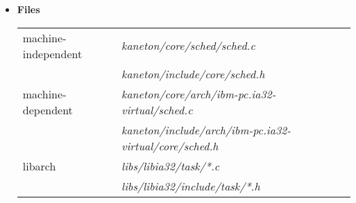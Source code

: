 \begin{itemize}
	 {
	   This function permits the current thread to relinquish
	   the processor voluntarily.

	   Do not care about the argument .
	 }

	 {
	   This function adds a runnable thread to the scheduler. Even
	   if the added thread has the highest priority, do not yield
	   the current thread.
	 }

	 {
	   This function removes a thread from the
	   scheduler. \textbf{Be careful:} the thread to remove can be
	   the currently executing thread.
	 }

	 {
	   This function asks the scheduler to update the thread
	    in its internal data structures since
	   for example the thread's priority just changed.
	 }

	 {
	   This function returns in  the identifier
	   of the thread currently executed.
	 }

	 {
	   This function just elects and schedules a new thread.

	   \textbf{Note}: the machine-dependent code of this function
	   takes an additional parameter.

		    {
		      The argument  is the new
		      thread to run.
		    }
	 }

	 {
	   This function initializes the scheduler.
	 }

	 {
	   This function cleans the scheduler.
	 }

  \item {\bf Files}\\

    \begin{tabular}{| l | l |}
      \hline
      machine-independent & {\em kaneton/core/sched/sched.c}\\
      &  {\em kaneton/include/core/sched.h}\\\hline
      machine-dependent & {\em kaneton/core/arch/ibm-pc.ia32-virtual/sched.c}\\
      & {\em kaneton/include/arch/ibm-pc.ia32-virtual/core/sched.h}\\\hline
      libarch & {\em libs/libia32/task/*.c}\\
      &  {\em libs/libia32/include/task/*.h}\\\hline
    \end{tabular}

\end{itemize}

